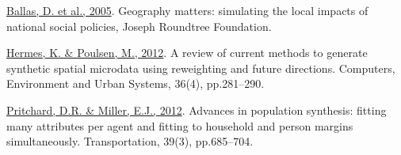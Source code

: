 \href{www.jrf.org.uk/sites/files/jrf/1859352669.pdf}{Ballas, D. et al.,
2005}. Geography matters: simulating the local impacts of national
social policies, Joseph Roundtree Foundation.

\href{http://linkinghub.elsevier.com/retrieve/pii/S0198971512000336}{Hermes,
K. \& Poulsen, M., 2012}. A review of current methods to generate
synthetic spatial microdata using reweighting and future directions.
Computers, Environment and Urban Systems, 36(4), pp.281--290.

\href{http://www.springerlink.com/index/10.1007/s11116-011-9367-4}{Pritchard,
D.R. \& Miller, E.J., 2012}. Advances in population synthesis: fitting
many attributes per agent and fitting to household and person margins
simultaneously. Transportation, 39(3), pp.685--704.
